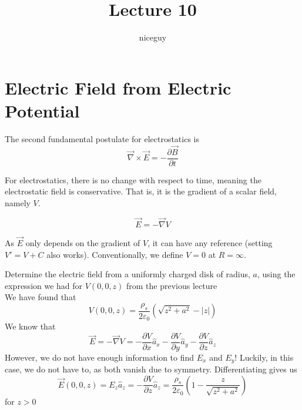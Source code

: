 \documentclass[12pt]{article}
\author{niceguy}
\title{Lecture 10}
\begin{document}
\maketitle

\section{Electric Field from Electric Potential}

The second fundamental postulate for electrostatics is
$$\vec{\nabla}\times\vec{E} = -\frac{\partial\vec{B}}{\partial t}$$

For electrostatics, there is no change with respect to time, meaning the electrostatic field is conservative. That is, it is the gradient of a scalar field, namely $V$.

$$\vec{E} = -\vec{\nabla}V$$

As $\vec{E}$ only depends on the gradient of $V$, it can have any reference (setting $V' = V + C$ also works). Conventionally, we define $V=0$ at $R=\infty$.

\begin{ex}
	Determine the electric field from a uniformly charged disk of radius, $a$, using the expression we had for $V(0,0,z)$ from the previous lecture \\
	We have found that
	$$V(0,0,z) = \frac{\rho_s}{2\varepsilon_0}\left(\sqrt{z^2+a^2}-|z|\right)$$
	We know that
	$$\vec{E} = -\vec{\nabla}V = -\frac{\partial V}{\partial x}\hat{a}_x - \frac{\partial V}{\partial y}\hat{a}_y -\frac{\partial V}{\partial z}\hat{a}_z$$
	However, we do not have enough information to find $E_x$ and $E_y$! Luckily, in this case, we do not have to, as both vanish due to symmetry. Differentiating gives us
	$$\vec{E}(0,0,z) = E_z\hat{a}_z = -\frac{\partial V}{\partial z}\hat{a}_z = \frac{\rho_s}{2\varepsilon_0}\left(1-\frac{z}{\sqrt{z^2+a^2}}\right)$$
	for $z>0$
\end{ex}
\end{document}
